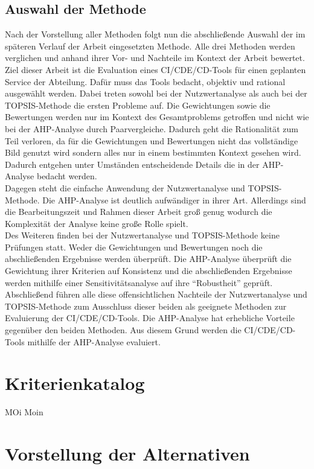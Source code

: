 \subsection{Auswahl der Methode}
Nach der Vorstellung aller Methoden folgt nun die abschließende Auswahl der im späteren Verlauf der Arbeit eingesetzten Methode. Alle drei Methoden werden verglichen und anhand ihrer Vor- und Nachteile im Kontext der Arbeit bewertet.\\
Ziel dieser Arbeit ist die Evaluation eines \ac{CI}/\ac{CDE}/\ac{CD}-Tools für einen geplanten Service der Abteilung. Dafür muss das Tools bedacht, objektiv und rational ausgewählt werden. Dabei treten sowohl bei der Nutzwertanalyse als auch bei der TOPSIS-Methode die ersten Probleme auf. Die Gewichtungen sowie die Bewertungen werden nur im Kontext des Gesamtproblems getroffen und nicht wie bei der AHP-Analyse durch Paarvergleiche. Dadurch geht die Rationalität zum Teil verloren, da für die Gewichtungen und Bewertungen nicht das vollständige Bild genutzt wird sondern alles nur in einem bestimmten Kontext gesehen wird. Dadurch entgehen unter Umständen entscheidende Details die in der AHP-Analyse bedacht werden.\\
Dagegen steht die einfache Anwendung der Nutzwertanalyse und TOPSIS-Methode. Die AHP-Analyse ist deutlich aufwändiger in ihrer Art. Allerdings sind die Bearbeitungszeit und Rahmen dieser Arbeit groß genug wodurch die Komplexität der Analyse keine große Rolle spielt.\\
Des Weiteren finden bei der Nutzwertanalyse und TOPSIS-Methode keine Prüfungen statt. Weder die Gewichtungen und Bewertungen noch die abschließenden Ergebnisse werden überprüft. Die AHP-Analyse überprüft die Gewichtung ihrer Kriterien auf Konsistenz und die abschließenden Ergebnisse werden mithilfe einer Sensitivitätsanalyse auf ihre \enquote{Robustheit} geprüft.\\
Abschließend führen alle diese offensichtlichen Nachteile der Nutzwertanalyse und TOPSIS-Methode zum Ausschluss dieser beiden als geeignete Methoden zur Evaluierung der \ac{CI}/\ac{CDE}/\ac{CD}-Tools. Die AHP-Analyse hat erhebliche Vorteile gegenüber den beiden Methoden. Aus diesem Grund werden die \ac{CI}/\ac{CDE}/\ac{CD}-Tools mithilfe der AHP-Analyse evaluiert.
\section{Kriterienkatalog}
MOi Moin
\section{Vorstellung der Alternativen}
